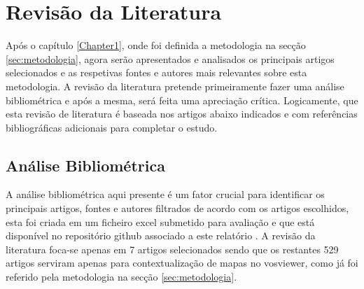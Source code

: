 
\chapter{Revisão da Literatura}	%
\label{Chapter2}

Após o capítulo \ref{Chapter1}, onde foi definida a metodologia na secção \ref{sec:metodologia}, agora serão apresentados  e analisados os principais artigos selecionados e as respetivas fontes e autores mais relevantes sobre esta metodologia.
A revisão da literatura pretende primeiramente fazer uma análise bibliométrica e após a mesma,  será feita uma apreciação crítica. Logicamente, que esta revisão de literatura é baseada nos artigos  abaixo indicados e com referências bibliográficas adicionais para completar o estudo. 


\section{Análise Bibliométrica}
\label{sec:analise_bibliometrica}

A análise bibliométrica aqui presente é um fator crucial para identificar os principais artigos, fontes e autores filtrados de acordo com os artigos escolhidos, esta foi criada em um ficheiro \gls{excel} submetido para avaliação e que está disponível no repositório \gls{github} associado a este relatório \cite{JunqueiraDevEduardoRepositório}.
A revisão da literatura foca-se apenas em 7 artigos selecionados sendo que os restantes 529 artigos serviram apenas para contextualização de mapas no \gls{vosviewer}, como já foi referido pela metodologia na secção \ref{sec:metodologia}.

